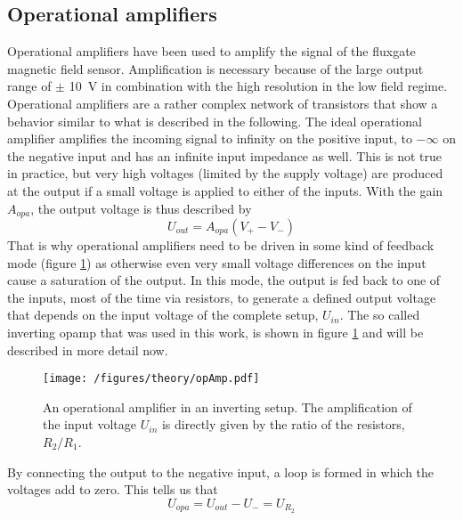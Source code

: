             \subsection{Operational amplifiers}
                Operational amplifiers have been used to amplify the signal of the fluxgate magnetic field sensor. Amplification is necessary because of the large output range of $\pm$ \SI{10}{\volt} in combination with the high resolution in the low field regime. Operational amplifiers are a rather complex network of transistors that show a behavior similar to what is described in the following. The ideal operational amplifier amplifies the incoming signal to infinity on the positive input, to $-\infty$ on the negative input and has an infinite input impedance as well. This is not true in practice, but very high voltages (limited by the supply voltage) are produced at the output if a small voltage is applied to either of the inputs. With the gain $A_{opa}$, the output voltage is thus described by
                \begin{equation}
                        \label{equation:theory:OPAvoltage}
                    U_{out} = A_{opa}(V_+ - V_-)
                \end{equation}
                That is why operational amplifiers need to be driven in some kind of feedback mode (figure \ref{figure:theory:opAmp}) as otherwise even very small voltage differences on the input cause a saturation of the output. In this mode, the output is fed back to one of the inputs, most of the time via resistors, to generate a defined output voltage that depends on the input voltage of the complete setup, $U_{in}$. The so called inverting opamp that was used in this work, is shown in figure \ref{figure:theory:opAmp} and will be described in more detail now.
                \begin{figure}
                    \label{figure:theory:opAmp}
                    \texttt{[image: /figures/theory/opAmp.pdf]}
                    \caption[Operational amplifier]{An operational amplifier in an inverting setup. The amplification of the input voltage $U_{in}$ is directly given by the ratio of the resistors, $R_2/R_1$.}
                \end{figure}
                By connecting the output to the negative input, a loop is formed in which the voltages add to zero. This tells us that
                \begin{equation*}
                    U_{opa} = U_{out} - U_- = U_{R_2}
                \end{equation*}
